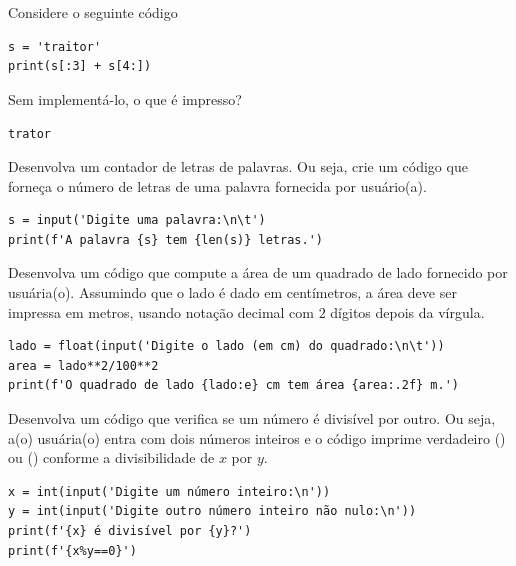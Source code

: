 \begin{exer}
  Considere o seguinte código

  \begin{lstlisting}
s = 'traitor'
print(s[:3] + s[4:])
\end{lstlisting}

Sem implementá-lo, o que é impresso?
\end{exer}
\begin{resp}
  \lstinline+trator+
\end{resp}

\begin{exer}
  Desenvolva um contador de letras de palavras. Ou seja, crie um código que forneça o número de letras de uma palavra fornecida por usuário(a).
\end{exer}
\begin{resp}

\begin{lstlisting}
s = input('Digite uma palavra:\n\t')
print(f'A palavra {s} tem {len(s)} letras.')
\end{lstlisting}

\end{resp}

\begin{exer}
  Desenvolva um código que compute a área de um quadrado de lado fornecido por usuária(o). Assumindo que o lado é dado em centímetros, a área deve ser impressa em metros, usando notação decimal com $2$ dígitos depois da vírgula.
\end{exer}
\begin{resp}

\begin{lstlisting}
lado = float(input('Digite o lado (em cm) do quadrado:\n\t'))
area = lado**2/100**2
print(f'O quadrado de lado {lado:e} cm tem área {area:.2f} m.')
\end{lstlisting}

\end{resp}

\begin{exer}
  Desenvolva um código que verifica se um número é divisível por outro. Ou seja, a(o) usuária(o) entra com dois números inteiros e o código imprime verdadeiro ({\PYTHONTrue}) ou ({\PYTHONFalse}) conforme a divisibilidade de $x$ por $y$.
\end{exer}
\begin{resp}

\begin{lstlisting}
x = int(input('Digite um número inteiro:\n'))
y = int(input('Digite outro número inteiro não nulo:\n'))
print(f'{x} é divisível por {y}?')
print(f'{x%y==0}')
\end{lstlisting}

\end{resp}

